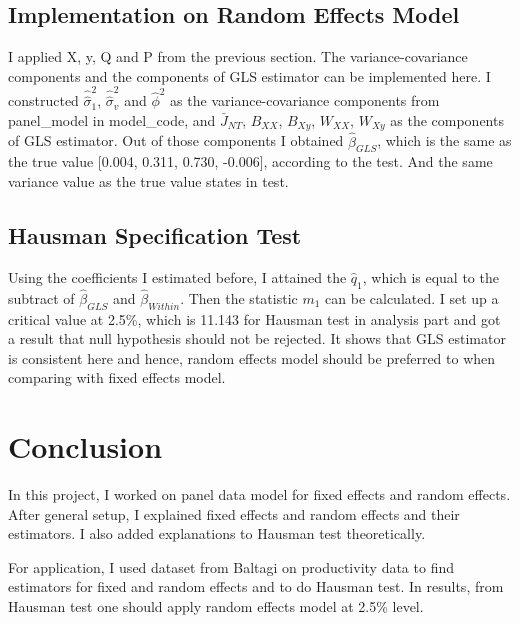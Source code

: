 \documentclass[11pt, a4paper, leqno]{article}
\begin{document}

\subsection{Implementation on Random Effects Model}
I applied X, y, Q and P from the previous section. The variance-covariance components and the components of GLS estimator can be implemented here. I constructed ${\widehat{\widehat{\sigma}}}_1^2$, ${\widehat{\widehat{\sigma}}}_v^2$ and $\widehat{\phi}^2$ as the variance-covariance components from panel\_model in model\_code, and $\bar J_{NT}$, $B_{XX}$, $B_{Xy}$, $W_{XX}$, $W_{Xy}$ as the components of GLS estimator. Out of those components I obtained $\widehat{\beta}_{GLS}$, which is the same as the true value [0.004, 0.311, 0.730, -0.006], according to the test. And the same variance value as the true value states in test.

\subsection{Hausman Specification Test}
Using the coefficients I estimated before, I attained the $\widehat q_1$, which is equal to the subtract of $\widehat \beta_{GLS}$ and $\widehat \beta_{Within}$. Then the statistic $m_1$ can be calculated. I set up a critical value at 2.5\%, which is 11.143 for Hausman test in analysis part and got a result that null hypothesis should not be rejected. It shows that GLS estimator is consistent here and hence, random effects model should be preferred to when comparing with fixed effects model.


\section{Conclusion}
In this project, I worked on panel data model for fixed effects and random effects. After general setup, I explained fixed effects and random effects and their estimators. I also added explanations to Hausman test theoretically.

For application, I used dataset from Baltagi on productivity data to find estimators for fixed and random effects and to do Hausman test. In results, from Hausman test one should apply random effects model at 2.5\% level.
\end{document}
